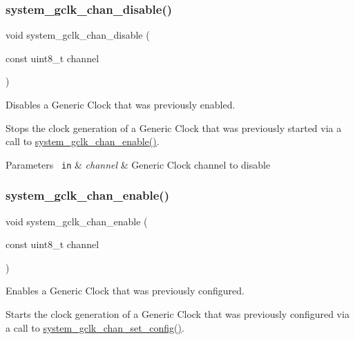 \subsubsection{\texorpdfstring{system\_gclk\_chan\_disable()}{system\_gclk\_chan\_disable()}}
{\footnotesize\ttfamily void system\+\_\+gclk\+\_\+chan\+\_\+disable (\begin{DoxyParamCaption}\item[{const uint8\+\_\+t}]{channel }\end{DoxyParamCaption})}



Disables a Generic Clock that was previously enabled. 

Stops the clock generation of a Generic Clock that was previously started via a call to \mbox{\hyperlink{group__asfdoc__sam0__system__clock__group_ga53e46ab144632c877a635ab70a7b51e1}{system\+\_\+gclk\+\_\+chan\+\_\+enable()}}.


\begin{DoxyParams}[1]{Parameters}
\mbox{\texttt{ in}}  & {\em channel} & Generic Clock channel to disable \\
\hline
\end{DoxyParams}
\mbox{\label{group__asfdoc__sam0__system__clock__group_ga53e46ab144632c877a635ab70a7b51e1}} 
\subsubsection{\texorpdfstring{system\_gclk\_chan\_enable()}{system\_gclk\_chan\_enable()}}
{\footnotesize\ttfamily void system\+\_\+gclk\+\_\+chan\+\_\+enable (\begin{DoxyParamCaption}\item[{const uint8\+\_\+t}]{channel }\end{DoxyParamCaption})}



Enables a Generic Clock that was previously configured. 

Starts the clock generation of a Generic Clock that was previously configured via a call to \mbox{\hyperlink{group__asfdoc__sam0__system__clock__group_ga0dfbe40e700101f619ddc5b4eb83d78b}{system\+\_\+gclk\+\_\+chan\+\_\+set\+\_\+config()}}.


